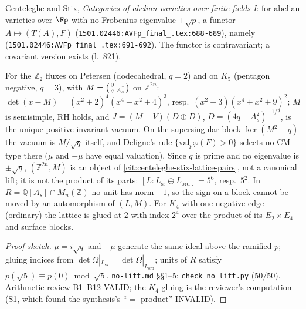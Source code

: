 \begin{theorem}
\label{cit:centeleghe-stix-lattice-pairs} 
Centeleghe and Stix, \emph{Categories of abelian varieties over finite fields I}: for abelian varieties over $\Fp$ with no Frobenius eigenvalue $\pm\sqrt p$, a functor
$A\mapsto(T(A),F)$ \texttt{} (\texttt{1501.02446:AVFp\_final\_.tex:688-689}), namely \texttt{} (\texttt{1501.02446:AVFp\_final\_.tex:691-692}). The functor is
contravariant; a covariant version exists (l.~821).
\end{theorem}
\begin{proposition}
\label{prop:gkp-supersingular-no-arithmetic-j} 
For the $\mathbb Z_2$ fluxes on Petersen (dodecahedral, $q = 2$) and on $K_5$ (pentagon negative, $q = 3$), with $M = \begin{psmallmatrix}0&-1\\q&A_s\end{psmallmatrix}$ on
$\mathbb Z^{2n}$: $\det(x-M) = (x^2+2)^4(x^4-x^2+4)^3$, resp.\ $(x^2+3)(x^4+x^2+9)^2$; $M$ is semisimple, RH holds, and $J = (M-V)(D\oplus D)$, $D = (4q-A_s^2)^{-1/2}$, is the
unique positive invariant vacuum. On the supersingular block $\ker(M^2+q)$ the vacuum is $M/\sqrt q$ itself, and Deligne's rule $\{\mathrm{val}_p\varphi(F)>0\}$ selects no CM %
type there ($\mu$ and $-\mu$ have equal valuation). Since $q$ is prime and no eigenvalue is $\pm\sqrt q$, $(\mathbb Z^{2n},M)$ is an object of %
\cref{cit:centeleghe-stix-lattice-pairs}, not a canonical lift; it is not the product of its parts: $[L:L_{\mathrm{ss}}\oplus L_{\mathrm{ord}}] = 5^6$, resp.\ $5^2$. In $R =
\mathbb Q[A_s]\cap M_n(\mathbb Z)$ no unit has norm $-1$, so the sign on a block cannot be moved by an automorphism of $(L,M)$. For $K_4$ with one negative edge (ordinary) the
lattice is glued at $2$ with index $2^4$ over the product of its $E_2\times E_4$ and surface blocks.
\end{proposition}
\begin{proof}[Proof sketch] $\mu = i\sqrt q$ and $-\mu$ generate the same ideal above the ramified $p$; gluing indices from $\det\Omega|_{L_{\mathrm{ss}}} = %
\det\Omega|_{L_{\mathrm{ord}}}$; units of $R$ satisfy $p(\sqrt5)\equiv p(0)\bmod\sqrt5$. \texttt{no-lift.md} \S\S1--5; \texttt{check\_no\_lift.py} ($50/50$). Arithmetic review %
B1--B12 VALID; the $K_4$ gluing is the reviewer's computation (S1, which found the synthesis's ``$=$ product'' INVALID).
\end{proof}


